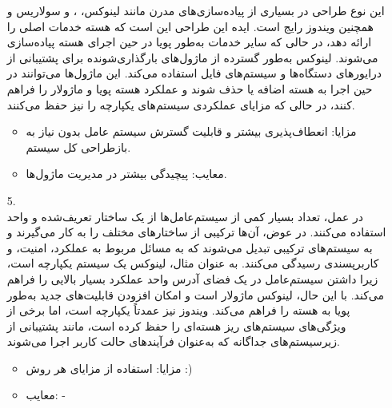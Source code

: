 \begin{qsolve}
	\begin{enumerate}
		\item [ ]
		این نوع طراحی در بسیاری از پیاده‌سازی‌های مدرن  مانند لینوکس، ، و سولاریس و همچنین ویندوز رایج است. ایده این طراحی این است که هسته خدمات اصلی را ارائه دهد، در حالی که سایر خدمات به‌طور پویا در حین اجرای هسته پیاده‌سازی می‌شوند. لینوکس به‌طور گسترده از ماژول‌های بارگذاری‌شونده برای پشتیبانی از درایورهای دستگاه‌ها و سیستم‌های فایل استفاده می‌کند. این ماژول‌ها می‌توانند در حین اجرا به هسته اضافه یا حذف شوند و عملکرد هسته پویا و ماژولار را فراهم کنند، در حالی که مزایای عملکردی سیستم‌های یکپارچه را نیز حفظ می‌کنند.
		
		\begin{itemize}
			\item
			مزایا: انعطاف‌پذیری بیشتر و قابلیت گسترش سیستم عامل بدون نیاز به بازطراحی کل سیستم.
			
			\item 
			معایب: پیچیدگی بیشتر در مدیریت ماژول‌ها.
		\end{itemize}
		
		
		
		
		\item [5.]
		\\
		در عمل، تعداد بسیار کمی از سیستم‌عامل‌ها از یک ساختار تعریف‌شده و واحد استفاده می‌کنند. در عوض، آن‌ها ترکیبی از ساختارهای مختلف را به کار می‌گیرند و به سیستم‌های ترکیبی تبدیل می‌شوند که به مسائل مربوط به عملکرد، امنیت، و کاربرپسندی رسیدگی می‌کنند. به عنوان مثال، لینوکس یک سیستم یکپارچه است، زیرا داشتن سیستم‌عامل در یک فضای آدرس واحد عملکرد بسیار بالایی را فراهم می‌کند. با این حال، لینوکس ماژولار است و امکان افزودن قابلیت‌های جدید به‌طور پویا به هسته را فراهم می‌کند. ویندوز نیز عمدتاً یکپارچه است، اما برخی از ویژگی‌های سیستم‌های ریز هسته‌ای را حفظ کرده است، مانند پشتیبانی از زیرسیستم‌های جداگانه که به‌عنوان فرآیندهای حالت کاربر اجرا می‌شوند.
		
		
		
		\begin{itemize}
			\item
			مزایا: استفاده از مزایای هر روش :)
			
			\item 
			معایب: -
		\end{itemize}
	\end{enumerate}
\end{qsolve}











